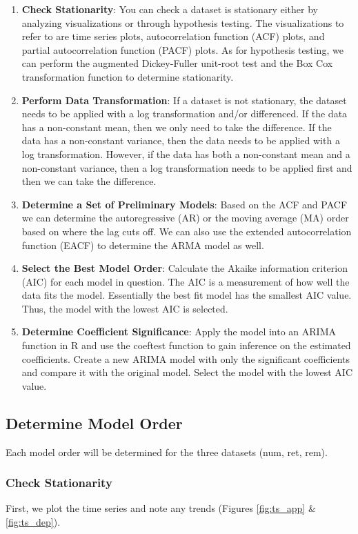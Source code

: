\documentclass[a4paper]{article}
\begin{document}
\begin{enumerate}
  \item \textbf{Check Stationarity}: You can check a dataset is stationary either by analyzing visualizations or through hypothesis testing. The visualizations to refer to are time series plots, autocorrelation function (ACF) plots, and partial autocorrelation function (PACF) plots. As for hypothesis testing, we can perform the augmented Dickey-Fuller unit-root test and the Box Cox transformation function to determine stationarity.
  \item \textbf{Perform Data Transformation}: If a dataset is not stationary, the dataset needs to be applied with a log transformation and/or differenced. If the data has a non-constant mean, then we only need to take the difference. If the data has a non-constant variance, then the data needs to be applied with a log transformation. However, if the data has both a non-constant mean and a non-constant variance, then a log transformation needs to be applied first and then we can take the difference.
  \item \textbf{Determine a Set of Preliminary Models}: Based on the ACF and PACF we can determine the autoregressive (AR) or the moving average (MA) order based on where the lag cuts off. We can also use the extended autocorrelation function (EACF) to determine the ARMA model as well.
  \item \textbf{Select the Best Model Order}: Calculate the Akaike information criterion (AIC) for each model in question. The AIC is a measurement of how well the data fits the model. Essentially the best fit model has the smallest AIC value. Thus, the model with the lowest AIC is  selected.
  \item \textbf{Determine Coefficient Significance}: Apply the model into an ARIMA function in R and use the coeftest function to gain inference on the estimated coefficients. Create a new ARIMA model with only the significant coefficients and compare it with the original model. Select the model with the lowest AIC value.
\end{enumerate}

\subsection{Determine Model Order}
Each model order will be determined for the three datasets (num, ret, rem).\\

\subsubsection{Check Stationarity}
First, we plot the time series and note any trends (Figures \ref{fig:ts_app} \& \ref{fig:ts_dep}).
\end{document}
